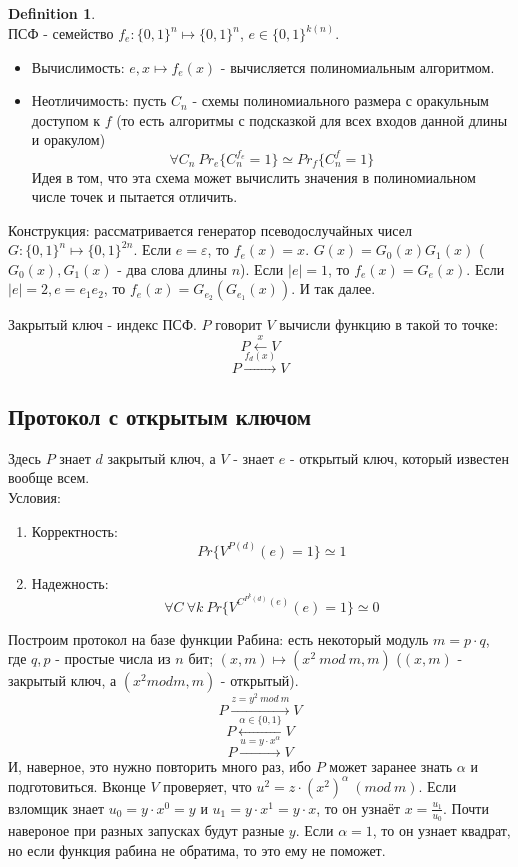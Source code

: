 \documentclass[a4paper]{article}
\theoremstyle{definition}
\newtheorem{definition}{Definition}
\theoremstyle{plain}
\begin{document}
\begin{definition}~\\
	ПСФ - семейство $f_e\colon \{0, 1\}^n \mapsto \{0, 1\}^n$, $e \in \{0, 1\}^{k(n)}$.
	\begin{itemize}
		\item Вычислимость: $e, x \mapsto f_e(x)$ - вычисляется полиномиальным алгоритмом.
		\item Неотличимость: пусть $C_n$ - схемы полиномиального размера
			с оракульным доступом к $f$ (то есть алгоритмы с 
			подсказкой для всех входов данной длины и оракулом)
			$$
				\forall C_n\ Pr_e\{C_n^{f_e} = 1\} \simeq Pr_f\{C_n^f = 1\}
			$$
			Идея в том, что эта схема может вычислить значения в полиномиальном числе точек
			и пытается отличить.
	\end{itemize}
	Конструкция: рассматривается генератор псеводослучайных чисел
	$G\colon \{0, 1\}^n \mapsto \{0, 1\}^{2n}$. Если $e = \varepsilon$, то $f_e(x) = x$.
	$G(x) = G_0(x)G_1(x)$ ($G_0(x), G_1(x)$ - два слова длины $n$).
	Если $|e| = 1$, то $f_e(x) = G_e(x)$. Если $|e| = 2, e = e_1 e_2$,
	то $f_e(x) = G_{e_2}(G_{e_1}(x))$. И так далее.
\end{definition}

\noindent Закрытый ключ - индекс ПСФ. $P$ говорит $V$ вычисли функцию в такой то точке:
$$
	P \xleftarrow{x} V
$$
$$
	P \xrightarrow{f_d(x)} V
$$

\subsection{Протокол с открытым ключом}

Здесь $P$ знает $d$ закрытый ключ, а $V$ - знает $e$ - открытый ключ, который известен вообще всем.~\\

\noindent Условия:
\begin{enumerate}
	\item Корректность:
		$$
			Pr\{V^{P(d)}(e) = 1\} \simeq 1	
		$$
	\item Надежность: 
		$$
			\forall C\ \forall k\ Pr\{V^{C^{P^k(d)}(e)}(e) = 1\} \simeq 0		
		$$
\end{enumerate}

\noindent Построим протокол на базе функции Рабина: есть некоторый модуль $m = p \cdot q$, где
$q, p$ - простые числа из $n$ бит; $(x, m) \mapsto (x^2\ mod\ m, m)$ ($(x, m)$ - закрытый ключ,
а $(x^2 mod m, m)$ - открытый).
$$
	P \xrightarrow{z = y^2\ mod\ m} V
$$
$$
	P \xleftarrow{\alpha \in \{0, 1\}} V
$$
$$
	P \xrightarrow{u = y\cdot x^{\alpha}} V
$$
И, наверное, это нужно повторить много раз, ибо $P$ может заранее знать $\alpha$ и подготовиться.
Вконце $V$ проверяет, что $u^2 = z\cdot (x^2)^{\alpha}\ (mod\ m)$. Если взломщик знает
$u_0 = y \cdot x^{0} = y$ и $u_1 = y \cdot x^{1} = y \cdot x$, то он узнаёт $x = \frac{u_1}{u_0}$.
Почти навероное при разных запусках будут разные $y$. Если $\alpha = 1$, то он узнает квадрат,
но если функция рабина не обратима, то это ему не поможет.~\\
\end{document}
